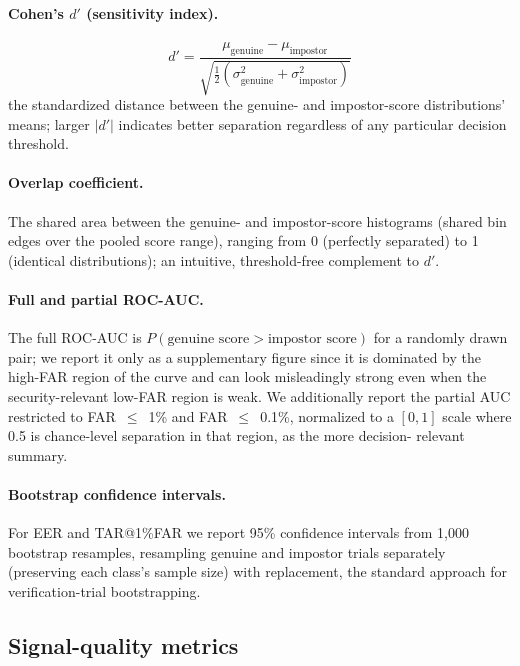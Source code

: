 \documentclass[11pt]{article}
\begin{document}
\paragraph{Cohen's $d'$ (sensitivity index).}
\begin{equation}
d' = \frac{\mu_{\mathrm{genuine}} - \mu_{\mathrm{impostor}}}
          {\sqrt{\tfrac{1}{2}\left(\sigma^2_{\mathrm{genuine}} + \sigma^2_{\mathrm{impostor}}\right)}}
\end{equation}
the standardized distance between the genuine- and impostor-score
distributions' means; larger $|d'|$ indicates better separation
regardless of any particular decision threshold.

\paragraph{Overlap coefficient.} The shared area between the genuine-
and impostor-score histograms (shared bin edges over the pooled score
range), ranging from 0 (perfectly separated) to 1 (identical
distributions); an intuitive, threshold-free complement to $d'$.

\paragraph{Full and partial ROC-AUC.} The full ROC-AUC is
$P(\text{genuine score} > \text{impostor score})$ for a randomly drawn
pair; we report it only as a supplementary figure since it is
dominated by the high-FAR region of the curve and can look
misleadingly strong even when the security-relevant low-FAR region is
weak. We additionally report the partial AUC restricted to
FAR~$\le$~1\% and FAR~$\le$~0.1\%, normalized to a $[0,1]$ scale where
0.5 is chance-level separation in that region, as the more decision-
relevant summary.

\paragraph{Bootstrap confidence intervals.} For EER and TAR@1\%FAR we
report 95\% confidence intervals from 1{,}000 bootstrap resamples,
resampling genuine and impostor trials separately (preserving each
class's sample size) with replacement, the standard approach for
verification-trial bootstrapping.

\subsection{Signal-quality metrics}
\label{sec:quality-metrics}
\end{document}
